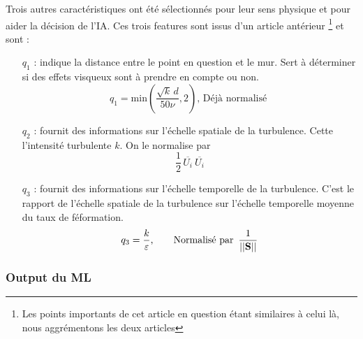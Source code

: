 \documentclass[a4paper,12pt]{report}
\newcommand{\bepar}[1]{
	\left( #1 \right)  
}
\newcommand{\norm}[1]{
	\left \vert \left \vert #1 \right \vert  \right \vert
}
\numberwithin{equation}{section} %
\begin{document}
\noindent Trois autres caractéristiques ont été sélectionnés pour leur sens physique et pour aider la décision de l'IA. Ces trois features sont issus d'un article antérieur \footnote{Les points importants de cet article en question étant similaires à celui là, nous aggrémentons les deux articles} et sont :
\begin{itemize}[leftmargin=3cm]
\item[$q_1$] : indique la distance entre le point en question et le mur. Sert à déterminer si des effets visqueux sont à prendre en compte ou non. $$ q_1 = \text{min}\bepar{\frac{\sqrt{k}\, d}{50 \nu}, 2} \text{, Déjà normalisé }$$
\item[$q_2$] : fournit des informations sur l'échelle spatiale de la turbulence. Cette l'intensité turbulente $k$. On le normalise par $$\frac{1}{2}\, \overline{U_i}\ \overline{U_i}$$
\item[$q_3$] : fournit des informations sur l'échelle temporelle de la turbulence. C'est le rapport de l'échelle spatiale de la turbulence sur l'échelle temporelle moyenne du taux de féformation. $$q_3 = \frac{k}{\varepsilon} \text{, \hspace{5mm} Normalisé par } \, \frac{1}{\norm{\textbf{S}}}$$
\end{itemize}

\subsubsection*{Output du ML}
\pagebreak
\end{document}
